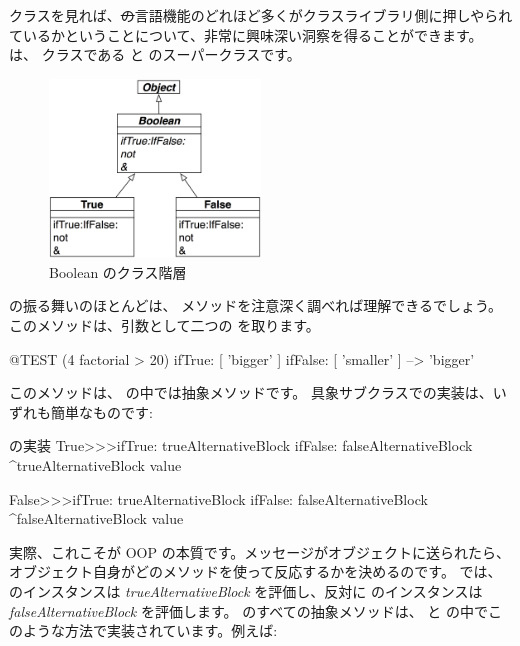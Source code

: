 \documentclass[a4paper,10pt,twoside]{book}
\begin{document}
 クラスを見れば、\st の言語機能のどれほど多くがクラスライブラリ側に押しやられているかということについて、非常に興味深い洞察を得ることができます。 は、 クラスである  と  のスーパークラスです。

\begin{figure}[ht]
  {\centerline {\includegraphics[width=0.5\textwidth]{BooleanHierarchy}}}
\caption{Boolean のクラス階層 }
\end{figure}

 の振る舞いのほとんどは、 メソッドを注意深く調べれば理解できるでしょう。このメソッドは、引数として二つの  を取ります。

\begin{code}{@TEST}
(4 factorial > 20) ifTrue: [ 'bigger' ] ifFalse: [ 'smaller' ] --> 'bigger'
\end{code}

このメソッドは、 の中では抽象メソッドです。
具象サブクラスでの実装は、いずれも簡単なものです:

\begin{method}{ の実装}
True>>>ifTrue: trueAlternativeBlock ifFalse: falseAlternativeBlock 
    ^trueAlternativeBlock value

False>>>ifTrue: trueAlternativeBlock ifFalse: falseAlternativeBlock 
    ^falseAlternativeBlock value
\end{method}

実際、これこそが OOP の本質です。メッセージがオブジェクトに送られたら、オブジェクト自身がどのメソッドを使って反応するかを決めるのです。 では、 のインスタンスは \emph{trueAlternativeBlock} を評価し、反対に  のインスタンスは \emph{falseAlternativeBlock} を評価します。 のすべての抽象メソッドは、 と  の中でこのような方法で実装されています。例えば:
\end{document}

